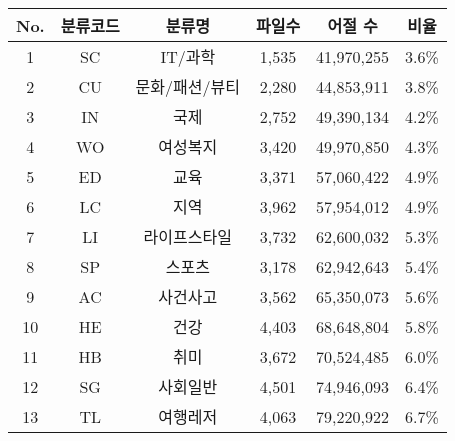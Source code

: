 \documentclass[11pt]{article}
\begin{document}
\begin{table}[h]
    \centering
    \begin{tabular}{cccccc}
        \textbf{No.}                    & \textbf{분류코드}   & \textbf{분류명}           & \textbf{파일수}     & \textbf{어절 수} & \textbf{비율} \\ \hline
        1                               & SC              & IT/과학                  & 1,535            & 41,970,255    & 3.6\%       \\
        2                               & CU              & 문화/패션/뷰티               & 2,280            & 44,853,911    & 3.8\%       \\
        3                               & IN              & 국제                     & 2,752            & 49,390,134    & 4.2\%       \\
        4                               & WO              & 여성복지                   & 3,420            & 49,970,850    & 4.3\%       \\
        5                               & ED              & 교육                     & 3,371            & 57,060,422    & 4.9\%       \\
        6                               & LC              & 지역                     & 3,962            & 57,954,012    & 4.9\%       \\
        7                               & LI              & 라이프스타일                 & 3,732            & 62,600,032    & 5.3\%       \\
        8                               & SP              & 스포츠                    & 3,178            & 62,942,643    & 5.4\%       \\
        9                               & AC              & 사건사고                   & 3,562            & 65,350,073    & 5.6\%       \\
        10                              & HE              & 건강                     & 4,403            & 68,648,804    & 5.8\%       \\
        11                              & HB              & 취미                     & 3,672            & 70,524,485    & 6.0\%       \\
        12                              & SG              & 사회일반                   & 4,501            & 74,946,093    & 6.4\%       \\
        13                              & TL              & 여행레저                   & 4,063            & 79,220,922    & 6.7\%       \\

\end{tabular}
\end{table}
\end{document}
